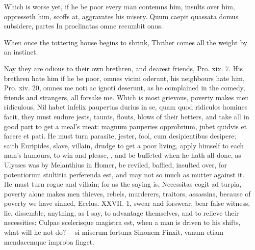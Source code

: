 {Which is worse yet, if he be poor every man contemns him, insults
over him, oppresseth him, scoffs at, aggravates his misery.
Quum caepit quassata domus subsidere, partes
In proclinatas omne recumbit onus.

When once the tottering house begins to shrink,
Thither comes all the weight by an instinct.

Nay they are odious to their own brethren, and dearest friends, Pro.
xix. 7. His brethren hate him if he be poor, omnes vicini
oderunt, his neighbours hate him, Pro. xiv. 20, omnes me noti ac
ignoti deserunt, as he complained in the comedy, friends and strangers,
all forsake me. Which is most grievous, poverty makes men ridiculous,
Nil habet infelix paupertas durius in se, quam quod ridiculos homines
facit, they must endure jests, taunts, flouts, blows of their
betters, and take all in good part to get a meal's meat: magnum
pauperies opprobrium, jubet quidvis et facere et pati. He must turn
parasite, jester, fool, cum desipientibus desipere; saith
Euripides, slave, villain, drudge to get a poor living, apply
himself to each man's humours, to win and please, \etc{}, and be buffeted
when he hath all done, as Ulysses was by Melanthius in Homer, be
reviled, baffled, insulted over, for potentiorum stultitia
perferenda est, and may not so much as mutter against it. He must turn
rogue and villain; for as the saying is, Necessitas cogit ad turpia,
poverty alone makes men thieves, rebels, murderers, traitors,
assassins, because of poverty we have sinned, Ecclus. XXVII. 1, swear
and forswear, bear false witness, lie, dissemble, anything, as I say,
to advantage themselves, and to relieve their necessities: 
Culpae scelerisque magistra est, when a man is driven to his shifts,
what will he not do?
---si miserum fortuna Sinonem
Finxit, vanum etiam mendacemque improba finget.

}

